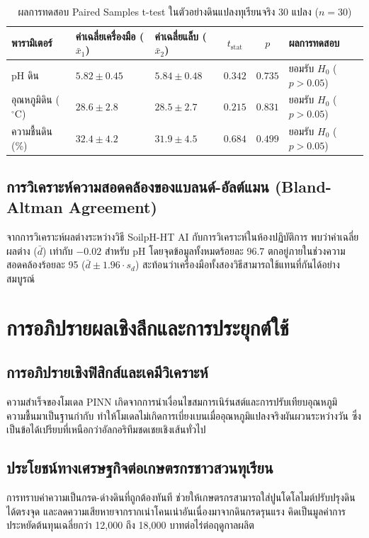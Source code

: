 \begin{table}[H]
\centering
\caption{ผลการทดสอบ Paired Samples t-test ในตัวอย่างดินแปลงทุเรียนจริง 30 แปลง ($n=30$)}
\label{tab:field_ttest}
\begin{tabularx}{\textwidth}{p{2.5cm}p{2.6cm}p{2.6cm}ccY}
    \toprule
    \textbf{พารามิเตอร์} & \textbf{ค่าเฉลี่ยเครื่องมือ ($\bar{x}_1$)} & \textbf{ค่าเฉลี่ยแล็บ ($\bar{x}_2$)} & \textbf{$t_{\text{stat}}$} & \textbf{$p$} & \textbf{ผลการทดสอบ} \\
    \midrule
    pH ดิน & $5.82 \pm 0.45$ & $5.84 \pm 0.48$ & $0.342$ & $0.735$ & ยอมรับ $H_0$ ($p > 0.05$) \\
    อุณหภูมิดิน ($^\circ\text{C}$) & $28.6 \pm 2.8$ & $28.5 \pm 2.7$ & $0.215$ & $0.831$ & ยอมรับ $H_0$ ($p > 0.05$) \\
    ความชื้นดิน (\%) & $32.4 \pm 4.2$ & $31.9 \pm 4.5$ & $0.684$ & $0.499$ & ยอมรับ $H_0$ ($p > 0.05$) \\
    \bottomrule
\end{tabularx}
\end{table}

\subsection{การวิเคราะห์ความสอดคล้องของแบลนด์-อัลต์แมน (Bland-Altman Agreement)}
จากการวิเคราะห์ผลต่างระหว่างวิธี SoilpH-HT AI กับการวิเคราะห์ในห้องปฏิบัติการ พบว่าค่าเฉลี่ยผลต่าง ($\bar{d}$) เท่ากับ $-0.02$ สำหรับ pH โดยจุดข้อมูลทั้งหมดร้อยละ 96.7 ตกอยู่ภายในช่วงความสอดคล้องร้อยละ 95 ($\bar{d} \pm 1.96 \cdot s_d$) สะท้อนว่าเครื่องมือทั้งสองวิธีสามารถใช้แทนที่กันได้อย่างสมบูรณ์

\section{การอภิปรายผลเชิงลึกและการประยุกต์ใช้}

\subsection{การอภิปรายเชิงฟิสิกส์และเคมีวิเคราะห์}
ความสำเร็จของโมเดล PINN เกิดจากการนำเงื่อนไขสมการเนิร์นสต์และการปรับเทียบอุณหภูมิความชื้นมาเป็นฐานกำกับ ทำให้โมเดลไม่เกิดการเบี่ยงเบนเมื่ออุณหภูมิแปลงจริงผันผวนระหว่างวัน ซึ่งเป็นข้อได้เปรียบที่เหนือกว่าอัลกอริทึมชดเชยเชิงเส้นทั่วไป

\subsection{ประโยชน์ทางเศรษฐกิจต่อเกษตรกรชาวสวนทุเรียน}
การทราบค่าความเป็นกรด-ด่างดินที่ถูกต้องทันที ช่วยให้เกษตรกรสามารถใส่ปูนโดโลไมต์ปรับปรุงดินได้ตรงจุด และลดความเสียหายจากรากเน่าโคนเน่าอันเนื่องมาจากดินกรดรุนแรง คิดเป็นมูลค่าการประหยัดต้นทุนเฉลี่ยกว่า 12,000 ถึง 18,000 บาทต่อไร่ต่อฤดูกาลผลิต


